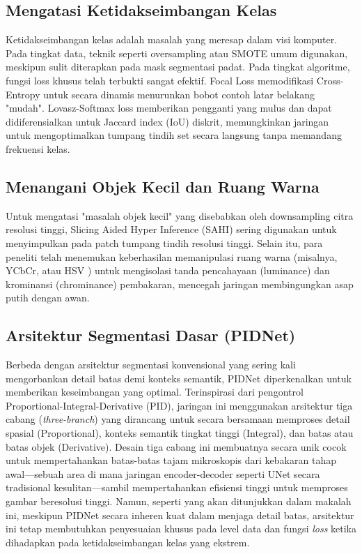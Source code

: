 \documentclass[conference]{IEEEtran}
\begin{document}
\subsection{Mengatasi Ketidakseimbangan Kelas}
Ketidakseimbangan kelas adalah masalah yang meresap dalam visi komputer. Pada tingkat data, teknik seperti oversampling atau SMOTE umum digunakan, meskipun sulit diterapkan pada mask segmentasi padat. Pada tingkat algoritme, fungsi loss khusus telah terbukti sangat efektif. Focal Loss \cite{focal} memodifikasi Cross-Entropy untuk secara dinamis menurunkan bobot contoh latar belakang "mudah". Lovasz-Softmax loss \cite{lovasz} memberikan pengganti yang mulus dan dapat didiferensialkan untuk Jaccard index (IoU) diskrit, memungkinkan jaringan untuk mengoptimalkan tumpang tindih set secara langsung tanpa memandang frekuensi kelas.

\subsection{Menangani Objek Kecil dan Ruang Warna}
Untuk mengatasi "masalah objek kecil" yang disebabkan oleh downsampling citra resolusi tinggi, Slicing Aided Hyper Inference (SAHI) \cite{sahi} sering digunakan untuk menyimpulkan pada patch tumpang tindih resolusi tinggi. Selain itu, para peneliti telah menemukan keberhasilan memanipulasi ruang warna (misalnya, YCbCr, atau HSV \cite{muhammad2023fire}) untuk mengisolasi tanda pencahayaan (luminance) dan krominansi (chrominance) pembakaran, mencegah jaringan membingungkan asap putih dengan awan.

\subsection{Arsitektur Segmentasi Dasar (PIDNet)}
Berbeda dengan arsitektur segmentasi konvensional yang sering kali mengorbankan detail batas demi konteks semantik, PIDNet \cite{pidnet} diperkenalkan untuk memberikan keseimbangan yang optimal. Terinspirasi dari pengontrol Proportional-Integral-Derivative (PID), jaringan ini menggunakan arsitektur tiga cabang (\textit{three-branch}) yang dirancang untuk secara bersamaan memproses detail spasial (Proportional), konteks semantik tingkat tinggi (Integral), dan batas atau batas objek (Derivative). Desain tiga cabang ini membuatnya secara unik cocok untuk mempertahankan batas-batas tajam mikroskopis dari kebakaran tahap awal---sebuah area di mana jaringan encoder-decoder seperti UNet secara tradisional kesulitan---sambil mempertahankan efisiensi tinggi untuk memproses gambar beresolusi tinggi. Namun, seperti yang akan ditunjukkan dalam makalah ini, meskipun PIDNet secara inheren kuat dalam menjaga detail batas, arsitektur ini tetap membutuhkan penyesuaian khusus pada level data dan fungsi \textit{loss} ketika dihadapkan pada ketidakseimbangan kelas yang ekstrem.
\end{document}
